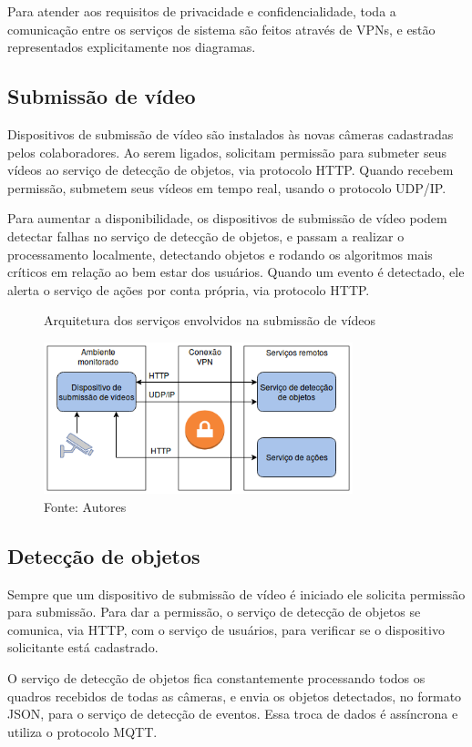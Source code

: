 \documentclass[]{politex}
\begin{document}
Para atender aos requisitos de privacidade e confidencialidade, toda a comunicação entre os serviços de sistema são feitos através de VPNs, e estão representados explicitamente nos diagramas.

\subsection{Submissão de vídeo}
Dispositivos de submissão de vídeo são instalados às novas câmeras cadastradas pelos colaboradores. Ao serem ligados, solicitam permissão para submeter seus vídeos ao serviço de detecção de objetos, via protocolo HTTP. Quando recebem permissão, submetem seus vídeos em tempo real, usando o protocolo UDP/IP. 

Para aumentar a disponibilidade, os dispositivos de submissão de vídeo podem detectar falhas no serviço de detecção de objetos, e passam a realizar o processamento localmente, detectando objetos e rodando os algoritmos mais críticos em relação ao bem estar dos usuários. Quando um evento é detectado, ele alerta o serviço de ações por conta própria, via protocolo HTTP.

\begin{figure}[H]
    \centering
    \caption{Arquitetura dos serviços envolvidos na submissão de vídeos}
    \includegraphics[width=0.8\textwidth]{arquitetura_sub_videos}
    \caption*{Fonte: Autores}
    \label{fig:arquitetura_video}
\end{figure}

\subsection{Detecção de objetos}
Sempre que um dispositivo de submissão de vídeo é iniciado ele solicita permissão para submissão. Para dar a permissão, o serviço de detecção de objetos se comunica, via HTTP, com o serviço de usuários, para verificar se o dispositivo solicitante está cadastrado.

O serviço de detecção de objetos fica constantemente processando todos os quadros recebidos de todas as câmeras, e envia os objetos detectados, no formato JSON, para o serviço de detecção de eventos. Essa troca de dados é assíncrona e utiliza o protocolo MQTT.
\end{document}
